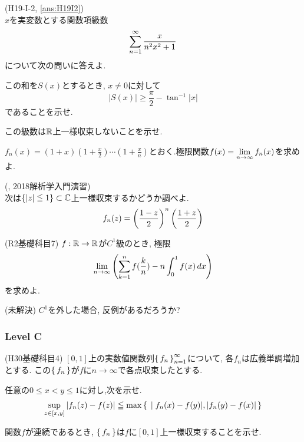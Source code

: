 \begin{prob} (H19-I-2, \ref{ans:H19I2}) \label{prob:H19I2}\\
$x$を実変数とする関数項級数
\[\displaystyle\sum_{n=1}^{\infty} \dfrac{x}{n^2x^2 + 1}\]
について次の問いに答えよ.
\ben
\item この和を$S(x)$とするとき, $x\neq 0$に対して
\[|S(x)| \geq \dfrac{\pi}{2} - \tan^{-1}{|x|}\]
であることを示せ.
\item この級数は$\mathbb{R}$上一様収束しないことを示せ.
\een
\end{prob}

\begin{prob}
$f_n(x) = (1+x)(1+\frac{x}{2})\cdots (1+\frac{x}{n})$とおく.極限関数$f(x) = \displaystyle\lim_{n\to \infty} f_n(x)$を求めよ.
\end{prob}

\begin{prob} (, 2018解析学入門演習) \\
次は$\{ |z|\leqq 1\}\subset \mathbb{C}$上一様収束するかどうか調べよ.
\[f_n(z) = \left( \dfrac{1-z}{2} \right)^{n}\left( \dfrac{1+z}{2} \right)\]
\end{prob}

\begin{prob} (R2基礎科目7)
$f:\mathbb{R}\to \mathbb{R}$が$C^1$級のとき, 極限
\[\lim_{n\to \infty}\left( \sum_{k=1}^{n} f(\dfrac{k}{n})   -n\int_{0}^{1} f(x)\, dx  \right)  \]
を求めよ.
\end{prob}

\begin{que} (未解決)
$C^1$を外した場合, 反例があるだろうか?
\end{que}



\subsubsection{Level C}
\begin{prob} (H30基礎科目4)\label{prob:H30kiso-4}
$[0,1]$上の実数値関数列$\set{f_n}_{n=1}^{\infty}$について, 各$f_n$は広義単調増加とする. この$\set{f_n}$が$f$に$n\to \infty$で各点収束したとする.
\ben
\item 任意の$0\leq x < y\leq 1$に対し,次を示せ.
\[\sup_{z\in [x,y]}|f_n(z) - f(z)| \leqq \max{\set{|f_n(x) - f(y)|, |f_n(y) - f(x)|}}\]
\item 関数$f$が連続であるとき, $\set{f_n}$は$f$に$[0,1]$上一様収束することを示せ.
\een
\end{prob}




